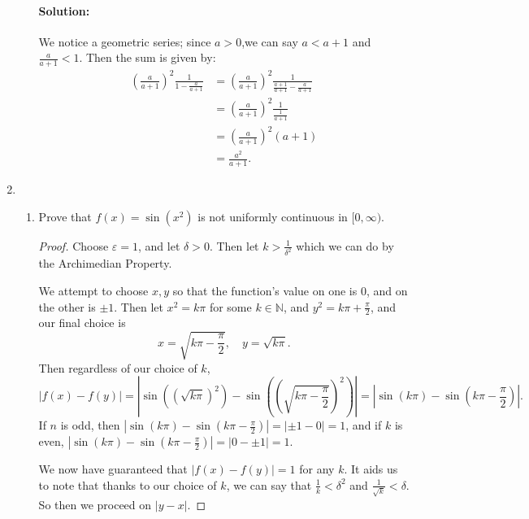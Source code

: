 \documentclass{article}
\begin{document}
\begin{enumerate}
\begin{enumerate}
        \paragraph{Solution: }We notice a geometric series; since $a>0$,we can say $a<a+1$ and $\frac{a}{a+1}<1$.
        Then the sum is given by:
        \begin{align*}
            \left(\frac{a}{a+1}\right)^2 \frac{1}{1-\frac{a}{a+1}}
            &= \left(\frac{a}{a+1}\right)^2 \frac{1}{\frac{a+1}{a+1}-\frac{a}{a+1}}\\
            &= \left(\frac{a}{a+1}\right)^2 \frac{1}{\frac{1}{a+1}}\\
            &= \left(\frac{a}{a+1}\right)^2 (a+1)\\
            &=\frac{a^2}{a+1}
        .\end{align*}

    \end{enumerate}
    \newpage
\item \begin{enumerate}
        \item Prove that $f\left(x\right)=\sin\left(x^{2}\right)$ is not uniformly continuous in $[0,\infty).$
            \begin{proof} 

                Choose $\varepsilon=1$, and let $\delta>0$. Then let $k>\frac{1}{\delta^2}$ 
                which we can do by the Archimedian Property.

                We attempt to choose $x,y$ so that the function's value on one is $0$, and on the other
                is $\pm 1$. Then let $x^2=k\pi$ for some $k\in \mathbb{N}$, and $y^2= k\pi+\frac{\pi}{2}$, 
                and our final choice is 
                \[
                x=\sqrt{k\pi-\frac{\pi}{2}},\quad y=\sqrt{k\pi}
                .\] 
                Then regardless of our choice of $k$, 
                \[
                |f(x)-f(y)|=
                \left|\sin\left(\left(\sqrt{ k\pi}\right)^2\right)
                -\sin\left(\left(\sqrt{ k\pi-\frac{\pi}{2}}\right)^2\right)\right|
                =\left|\sin(k\pi)-\sin\left(k\pi-\frac{\pi}{2}\right)\right|.
                \] 
                If $n$ is odd, then 
                $|\sin(k\pi)-\sin\left(k\pi-\frac{\pi}{2}\right)|=|\pm 1 -0|=1$, and if $k$ is even,
                $|\sin(k\pi)-\sin\left(k\pi-\frac{\pi}{2}\right)|=|0 -\pm 1|=1$.

                We now have guaranteed that $|f(x)-f(y)|=1$ for any $k$. 
                It aids us to note that thanks to our choice of $k$, we can say that 
                $\frac{1}{k}<\delta^2$ and $\frac{1}{\sqrt{k} }<\delta$. So then we proceed
                on $|y-x|$.


\end{proof}
\end{enumerate}
\end{enumerate}
\end{document}
